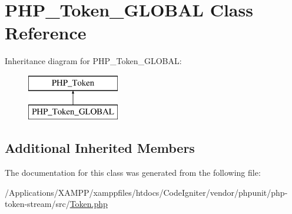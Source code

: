 \hypertarget{class_p_h_p___token___g_l_o_b_a_l}{}\section{P\+H\+P\+\_\+\+Token\+\_\+\+G\+L\+O\+B\+AL Class Reference}
\label{class_p_h_p___token___g_l_o_b_a_l}
Inheritance diagram for P\+H\+P\+\_\+\+Token\+\_\+\+G\+L\+O\+B\+AL\+:\begin{figure}[H]
\begin{center}
\leavevmode
\includegraphics[height=2.000000cm]{class_p_h_p___token___g_l_o_b_a_l}
\end{center}
\end{figure}
\subsection*{Additional Inherited Members}


The documentation for this class was generated from the following file\+:\begin{DoxyCompactItemize}
\item 
/\+Applications/\+X\+A\+M\+P\+P/xamppfiles/htdocs/\+Code\+Igniter/vendor/phpunit/php-\/token-\/stream/src/\mbox{\hyperlink{_token_8php}{Token.\+php}}\end{DoxyCompactItemize}
